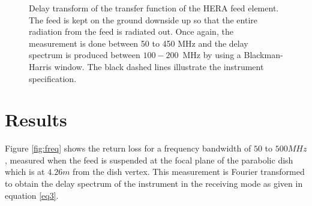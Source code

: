 \documentclass[iop]{emulateapj}
\begin{document}
\begin{figure}
\begin{minipage}[b]{0.5\linewidth}
\caption{Delay transform of the transfer function of the HERA feed element. The feed is kept on the ground downside up so that the entire radiation from the feed is radiated out. Once again, the measurement is done between 50 to 450 MHz and the delay spectrum is produced between $100-200$~MHz by using a Blackman-Harris window. The black dashed lines illustrate the instrument specification.}
\label{fig:outofthedish}
\end{minipage}
\end{figure}

\section{Results}

Figure \ref{fig:freq} shows the return loss for a frequency bandwidth of $50$ to
$500MHz$, measured when the feed is suspended at the focal plane of the parabolic dish which is at $4.26m$ from the dish vertex. 
This measurement is Fourier transformed to obtain the delay spectrum of the instrument in the receiving mode as given in equation \ref{eq3}.
\end{document}
